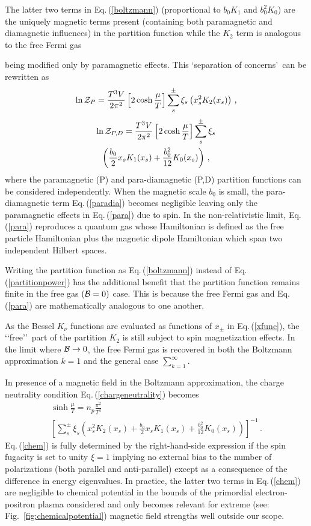 \documentclass[reprint]{revtex4-2}
\newcommand{\req}[1]{Eq.\,(\ref{#1})}
\newcommand{\rf}[1]{Fig.~{\ref{#1}}}
\newcommand*{\xblue}{\color{black}}
\begin{document}
The latter two terms in \req{boltzmann} (proportional to $b_{0}K_{1}$ and $b_{0}^{2}K_{0}$) are the uniquely magnetic terms present (containing both paramagnetic and diamagnetic influences) in the partition function while the $K_{2}$ term is analogous to the free Fermi gas~\cite{greiner2012thermodynamics} {\xblue being modified only by paramagnetic effects. This \lq separation of concerns\rq\ can be rewritten as
\begin{align}
    \label{para}
    \ln{\cal Z}_{P}=\frac{T^{3}V}{2\pi^{2}}\left[2\cosh{\frac{\mu}{T}}\right]\sum_{s}^{\pm}\xi_{s}\left(x_{s}^{2}K_{2}(x_{s})\right)\,,
\end{align}
\begin{multline}
    \label{paradia}
    \ln{\cal Z}_{P,D}=\frac{T^{3}V}{2\pi^{2}}\left[2\cosh{\frac{\mu}{T}}\right]\sum_{s}^{\pm}\xi_{s}\\
    \left(\frac{b_{0}}{2}x_{s}K_{1}(x_{s})+\frac{b_{0}^{2}}{12}K_{0}(x_{s})\right)\,,
\end{multline}
where the paramagnetic (P) and para-diamagnetic (P,D) partition functions can be considered independently. When the magnetic scale $b_{0}$ is small, the para-diamagnetic term \req{paradia} becomes negligible leaving only the paramagnetic effects in \req{para} due to spin. In the non-relativistic limit, \req{para} reproduces a quantum gas whose Hamiltonian is defined as the free particle Hamiltonian plus the magnetic dipole Hamiltonian which span two independent Hilbert spaces.

Writing the partition function as \req{boltzmann} instead of \req{partitionpower} has the additional benefit that the partition function remains finite in the free gas $({\cal B}=0)$ case. This is because the free Fermi gas and \req{para} are mathematically analogous to one another.} As the Bessel $K_{\nu}$ functions are evaluated as functions of $x_{\pm}$ in \req{xfunc}, the \lq\lq free\rq\rq\ part of the partition $K_{2}$ is still subject to spin magnetization effects. In the limit where ${\cal B}\rightarrow0$, the free Fermi gas is recovered in both the Boltzmann approximation $k=1$ and the general case $\sum_{k=1}^{\infty}$.

In presence of a magnetic field in the Boltzmann approximation, the charge neutrality condition \req{chargeneutrality} becomes
\begin{multline}
    \label{chem}
    \sinh{\frac{\mu}{T}}=n_{p}\frac{\pi^{2}}{T^{3}}\\
    \left[\sum_{s}^{\pm}\xi_{s}\left(x_{s}^{2}K_{2}(x_{s})+\frac{b_{0}}{2}x_{s}K_{1}(x_{s})+\frac{b_{0}^{2}}{12}K_{0}(x_{s})\right)\right]^{-1}\,.
\end{multline}
\req{chem} is fully determined by the right-hand-side expression if the spin fugacity is set to unity $\xi=1$ implying no external bias to the number of polarizations (both parallel and anti-parallel) except as a consequence of the difference in energy eigenvalues. In practice, the latter two terms in \req{chem} are negligible to chemical potential in the bounds of the primordial electron-positron plasma considered and only becomes relevant for extreme (see: \rf{fig:chemicalpotential}) magnetic field strengths well outside our scope.
\end{document}
